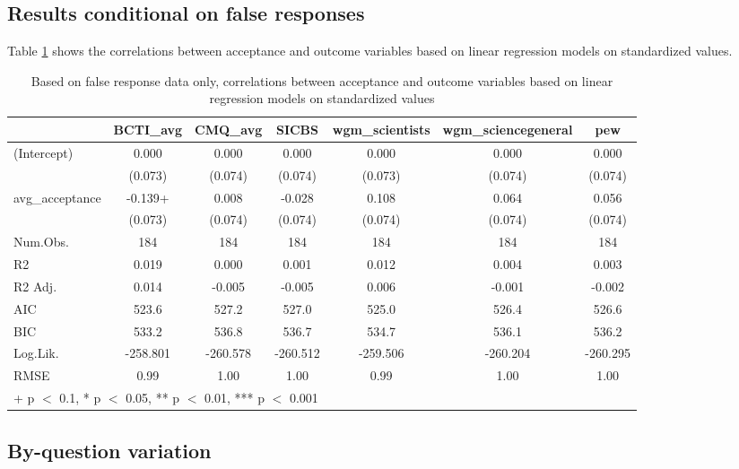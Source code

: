 \documentclass[
  doc,floatsintext]{apa6}
\begin{document}
\subsection{Results conditional on false responses}\label{results-conditional-on-false-responses}

Table \ref{tab:false-response-regression} shows the correlations between acceptance and outcome variables based on linear regression models on standardized values.

\begin{table}

\caption{\label{tab:false-response-regression}Based on false response data only, correlations between acceptance and outcome variables based on linear regression models on standardized values}
\centering
\begin{tabular}[t]{lcccccc}
\toprule
  & BCTI\_avg & CMQ\_avg & SICBS & wgm\_scientists & wgm\_sciencegeneral & pew\\
\midrule
(Intercept) & 0.000 & 0.000 & 0.000 & 0.000 & 0.000 & 0.000\\
 & (0.073) & (0.074) & (0.074) & (0.073) & (0.074) & (0.074)\\
avg\_acceptance & -0.139+ & 0.008 & -0.028 & 0.108 & 0.064 & 0.056\\
 & (0.073) & (0.074) & (0.074) & (0.074) & (0.074) & (0.074)\\
\midrule
Num.Obs. & 184 & 184 & 184 & 184 & 184 & 184\\
R2 & 0.019 & 0.000 & 0.001 & 0.012 & 0.004 & 0.003\\
R2 Adj. & 0.014 & -0.005 & -0.005 & 0.006 & -0.001 & -0.002\\
AIC & 523.6 & 527.2 & 527.0 & 525.0 & 526.4 & 526.6\\
BIC & 533.2 & 536.8 & 536.7 & 534.7 & 536.1 & 536.2\\
Log.Lik. & -258.801 & -260.578 & -260.512 & -259.506 & -260.204 & -260.295\\
RMSE & 0.99 & 1.00 & 1.00 & 0.99 & 1.00 & 1.00\\
\bottomrule
\multicolumn{7}{l}{\rule{0pt}{1em}+ p $<$ 0.1, * p $<$ 0.05, ** p $<$ 0.01, *** p $<$ 0.001}\\
\end{tabular}
\end{table}

\subsection{By-question variation}\label{by-question-variation}
\end{document}
